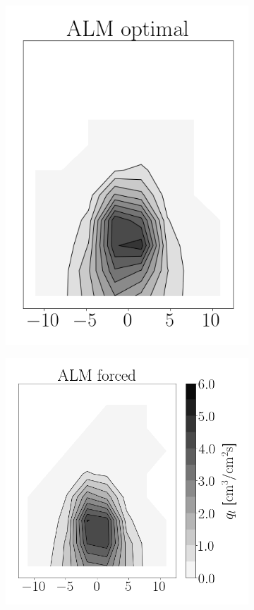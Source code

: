 \begin{figure}[h!]
\begin{subfigure}[b]{0.2\textwidth}
   \includegraphics[scale=0.4]{./part2_developments/figures_ch6_lagrangian_JICF/params_gaseous_initial_conditions/maps/ALM_FDC_0p24_flux}
\end{subfigure}
\hspace*{0.00in}
\begin{subfigure}[b]{0.2\textwidth}
	\flushleft
   \includegraphics[scale=0.4]{./part2_developments/figures_ch6_lagrangian_JICF/params_gaseous_initial_conditions/maps/ALM_FDC_0p30_flux}
\end{subfigure}


\end{figure}
